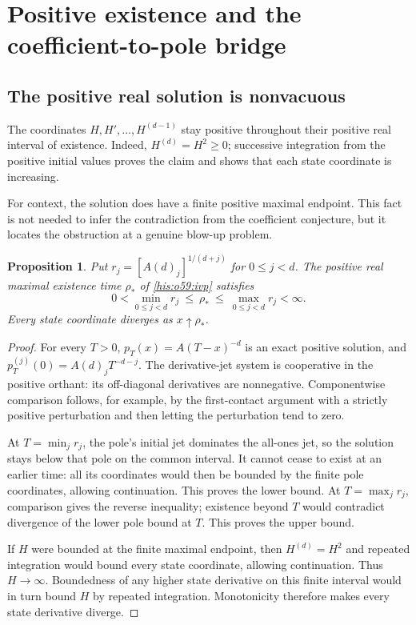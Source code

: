 \documentclass[11pt]{article}
\newtheorem{proposition}[theorem]{Proposition}
\theoremstyle{remark}\newtheorem{remark}[theorem]{Remark}
\numberwithin{equation}{section}
\begin{document}
\section{Positive existence and the coefficient-to-pole bridge}
\subsection{The positive real solution is nonvacuous}
The coordinates $H,H',\ldots,H^{(d-1)}$ stay positive throughout their
positive real interval of existence. Indeed, $H^{(d)}=H^2\ge0$;
successive integration from the positive initial values proves the
claim and shows that each state coordinate is increasing.

For context, the solution does have a finite positive maximal endpoint.
This fact is not needed to infer the contradiction from the coefficient
conjecture, but it locates the obstruction at a genuine blow-up problem.
\begin{proposition}\label{his:o59:blowup}
Put $r_j=[A(d)_j]^{1/(d+j)}$ for $0\le j<d$. The positive real maximal
existence time $\rho_*$ of \eqref{his:o59:ivp} satisfies
\begin{equation}\label{his:o59:rho-bounds}
0<\min_{0\le j<d}r_j\ \le\ \rho_*\ \le\
\max_{0\le j<d}r_j<\infty.
\end{equation}
Every state coordinate diverges as $x\uparrow\rho_*$.
\end{proposition}
\begin{proof}
For every $T>0$, $p_T(x)=A(T-x)^{-d}$ is an exact positive solution,
and $p_T^{(j)}(0)=A(d)_jT^{-d-j}$. The derivative-jet system is
cooperative in the positive orthant: its off-diagonal derivatives are
nonnegative. Componentwise comparison follows, for example, by the
first-contact argument with a strictly positive perturbation and then
letting the perturbation tend to zero.

At $T=\min_jr_j$, the pole's initial jet dominates the all-ones jet,
so the solution stays below that pole on the common interval. It cannot
cease to exist at an earlier time: all its coordinates would then be
bounded by the finite pole coordinates, allowing continuation. This
proves the lower bound. At $T=\max_jr_j$, comparison gives the reverse
inequality; existence beyond $T$ would contradict divergence of the
lower pole bound at $T$. This proves the upper bound.

If $H$ were bounded at the finite maximal endpoint, then $H^{(d)}=H^2$
and repeated integration would bound every state coordinate, allowing
continuation. Thus $H\to\infty$. Boundedness of any higher state
derivative on this finite interval would in turn bound $H$ by repeated
integration. Monotonicity therefore makes every state derivative
diverge.
\end{proof}
\end{document}
